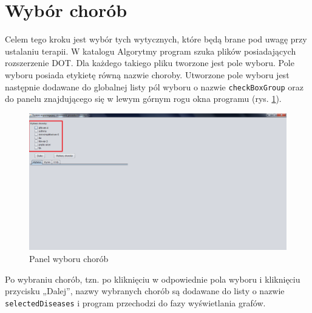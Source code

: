 \section{Wybór chorób}
Celem tego kroku jest wybór tych wytycznych, które będą brane pod uwagę przy ustalaniu terapii.
W katalogu Algorytmy program szuka plików posiadających rozszerzenie DOT. Dla każdego takiego pliku tworzone jest pole wyboru. Pole wyboru posiada etykietę równą nazwie choroby. 
Utworzone pole wyboru jest następnie dodawane do globalnej listy pól wyboru o nazwie \texttt{checkBoxGroup} oraz do panelu 
znajdującego się w lewym górnym rogu okna programu (rys. \ref{fig:wybor_chorob}). 
\begin{figure}[H]
\centering
\includegraphics[width=\textwidth]{img/wybor_chorob.png}
\caption{Panel wyboru chorób}
\label{fig:wybor_chorob}
\end{figure}
Po wybraniu chorób, tzn. po kliknięciu w odpowiednie pola wyboru i kliknięciu przycisku „Dalej”, nazwy wybranych chorób są dodawane do listy o nazwie \texttt{selectedDiseases} i program przechodzi do fazy wyświetlania grafów. 

